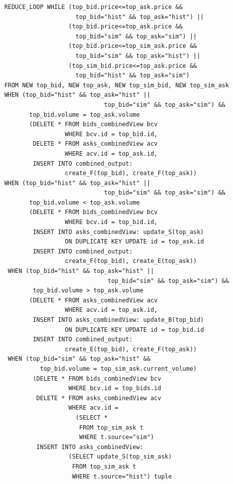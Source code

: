 \documentclass{article}
\begin{document}
\begin{verbatim}  
    REDUCE_LOOP WHILE (top_bid.price<=top_ask.price && 
                        top_bid="hist" && top_ask="hist") ||
                      (top_bid.price<=top_ask.price && 
                        top_bid="sim" && top_ask="sim") ||
                      (top_bid.price<=top_sim_ask.price && 
                        top_bid="sim" && top_ask="hist") ||
                      (top_sim_bid.price<=top_ask.price && 
                        top_bid="hist" && top_ask="sim")
    FROM NEW top_bid, NEW top_ask, NEW top_sim_bid, NEW top_sim_ask
    WHEN (top_bid="hist" && top_ask="hist" ||
                                top_bid="sim" && top_ask="sim") &&
           top_bid.volume = top_ask.volume
           (DELETE * FROM bids_combinedView bcv 
                     WHERE bcv.id = top_bid.id,
            DELETE * FROM asks_combinedView acv 
                     WHERE acv.id = top_ask.id,
            INSERT INTO combined_output:
                     create_F(top_bid), create_F(top_ask))
    WHEN (top_bid="hist" && top_ask="hist" ||
                                top_bid="sim" && top_ask="sim") &&
           top_bid.volume < top_ask.volume                     
           (DELETE * FROM bids_combinedView bcv 
                     WHERE bcv.id = top_bid.id,
            INSERT INTO asks_combinedView: update_S(top_ask) 
                     ON DUPLICATE KEY UPDATE id = top_ask.id
            INSERT INTO combined_output: 
                     create_F(top_bid), create_E(top_ask))
     WHEN (top_bid="hist" && top_ask="hist" ||
                                 top_bid="sim" && top_ask="sim") &&
            top_bid.volume > top_ask.volume                     
           (DELETE * FROM asks_combinedView acv 
                     WHERE acv.id = top_ask.id,
            INSERT INTO asks_combinedView: update_B(top_bid) 
                     ON DUPLICATE KEY UPDATE id = top_bid.id
            INSERT INTO combined_output: 
                     create_E(top_bid), create_F(top_ask))
     WHEN (top_bid="sim" && top_ask="hist" &&
              top_bid.volume = top_sim_ask.current_volume)
            (DELETE * FROM bids_combinedView bcv
                      WHERE bcv.id = top_bids.id
             DELETE * FROM asks_combinedView acv
                      WHERE acv.id = 
                        (SELECT *
                         FROM top_sim_ask t
                         WHERE t.source="sim")
             INSERT INTO asks_combinedView: 
                      (SELECT update_S(top_sim_ask)
                       FROM top_sim_ask t
                       WHERE t.source="hist") tuple

\end{verbatim}
\end{document}
